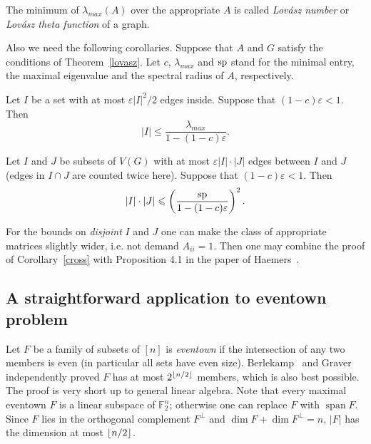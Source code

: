 \documentclass[8pt]{article}
\DeclareMathOperator{\sppan}{\operatorname{span}}
\begin{document}
The minimum of $\lambda_{max}(A)$ over the appropriate $A$ is called \textit{Lov{\'a}sz number} or \textit{Lov{\'a}sz theta function} of a graph.

Also we need the following corollaries. 
Suppose that $A$ and $G$ satisfy the conditions of Theorem~\ref{lovasz}.
Let $c$, $\lambda_{max}$ and $\operatorname{\operatorname{sp}}$ stand for the minimal entry, the maximal eigenvalue and the spectral radius of $A$, respectively.

\begin{corollary}
Let $I$ be a set with at most $\varepsilon |I|^2/2$ edges inside. 
Suppose that $(1-c)\varepsilon < 1$. Then
\[
|I| \leq \frac{\lambda_{max}}{1-(1-c)\varepsilon}.
\]
\label{supersaturation}
\end{corollary}


\begin{corollary}
Let $I$ and $J$ be subsets of $V(G)$ with at most $\varepsilon |I| \cdot |J|$ edges between $I$ and $J$ (edges in $I\cap J$ are counted twice here).
Suppose that $(1-c)\varepsilon < 1$. Then
\[
|I| \cdot |J| \leqslant \left( \frac{\operatorname{\operatorname{sp}}}{1-(1-c)\varepsilon} \right)^2.
\]
\label{cross}
\end{corollary}

For the bounds on \textit{disjoint} $I$ and $J$ one can make the class of appropriate matrices slightly wider, i.e.
not demand $A_{ii} = 1$. Then one may combine the proof of Corollary~\ref{cross} with Proposition 4.1 in the paper of Haemers~\cite{haemers2001bicliques}.



\subsection{A straightforward application to eventown problem}

Let $F$ be a family of subsets of $[n]$ is \textit{eventown} if the intersection of any two members is even (in particular all sets have even size).
Berlekamp~\cite{berlekamp1969subsets} and Graver~\cite{graver1975boolean} independently proved $F$ has at most $2^{\left\lfloor n/2\right\rfloor}$ members, which is also best possible.
The proof is very short up to general linear algebra. Note that every maximal eventown $F$ is a linear subspace of $\mathbb{F}_2^n$; otherwise one can replace $F$ with $\sppan F$.
Since $F$ lies in the orthogonal complement $F^\perp$ and $\dim F + \dim F^\perp = n$, $|F|$ has the dimension at most $\left\lfloor n/2 \right\rfloor$.
\end{document}
